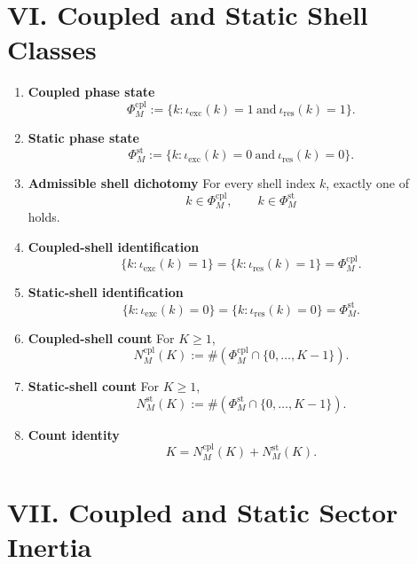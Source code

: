 \documentclass[11pt,letterpaper]{article}
\theoremstyle{plain}
\theoremstyle{definition}
\theoremstyle{remark}
\newcommand{\ExcIndex}{\iota}
\newcommand{\CoupledState}{\Phi^{\mathrm{cpl}}}
\newcommand{\StaticState}{\Phi^{\mathrm{st}}}
\begin{document}
\section*{VI. Coupled and Static Shell Classes}

\begin{enumerate}[resume]
\item \textbf{Coupled phase state}
\[
\CoupledState_M
:=
\{k:\ExcIndex_{\mathrm{exc}}(k)=1\ \text{and}\ \ExcIndex_{\mathrm{res}}(k)=1\}.
\]

\item \textbf{Static phase state}
\[
\StaticState_M
:=
\{k:\ExcIndex_{\mathrm{exc}}(k)=0\ \text{and}\ \ExcIndex_{\mathrm{res}}(k)=0\}.
\]

\item \textbf{Admissible shell dichotomy}
For every shell index \(k\), exactly one of
\[
k\in\CoupledState_M,
\qquad
k\in\StaticState_M
\]
holds.

\item \textbf{Coupled-shell identification}
\[
\{k:\ExcIndex_{\mathrm{exc}}(k)=1\}
=
\{k:\ExcIndex_{\mathrm{res}}(k)=1\}
=
\CoupledState_M.
\]

\item \textbf{Static-shell identification}
\[
\{k:\ExcIndex_{\mathrm{exc}}(k)=0\}
=
\{k:\ExcIndex_{\mathrm{res}}(k)=0\}
=
\StaticState_M.
\]

\item \textbf{Coupled-shell count}
For \(K\ge 1\),
\[
N_M^{\mathrm{cpl}}(K):=\#(\CoupledState_M\cap\{0,\dots,K-1\}).
\]

\item \textbf{Static-shell count}
For \(K\ge 1\),
\[
N_M^{\mathrm{st}}(K):=\#(\StaticState_M\cap\{0,\dots,K-1\}).
\]

\item \textbf{Count identity}
\[
K=N_M^{\mathrm{cpl}}(K)+N_M^{\mathrm{st}}(K).
\]
\end{enumerate}

\section*{VII. Coupled and Static Sector Inertia}
\end{document}
